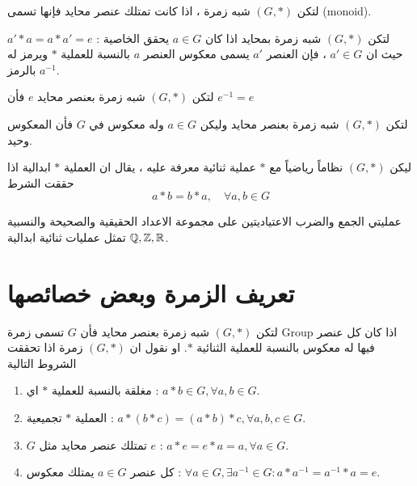 \begin{definition}[(monoid)]
	لتكن $(G, *)$ شبه زمرة ، اذا كانت تمتلك عنصر محايد فإنها تسمى (monoid).
\end{definition}

\begin{definition}[(  المعكوس )]
	لتكن $(G, *)$ شبه زمرة بمحايد اذا كان $a\in G$ يحقق الخاصية : $a'*a=a*a'=e$ حيث ان $a'\in G$ ، فإن العنصر $a'$ يسمى معكوس العنصر $a$ بالنسبة للعملية $*$ ويرمز له بالرمز $a^{-1}$.
\end{definition}

\begin{note}
	لتكن $(G, *)$ شبه زمرة بعنصر محايد $e$ فأن $e^{-1}=e$
\end{note}

\begin{theorem}
	لتكن $(G, *)$ شبه زمرة بعنصر محايد وليكن $a\in G$ وله معكوس في $G$ فأن المعكوس وحيد.
\end{theorem}

\begin{definition}
	ليكن $(G, *)$ نظاماً رياضياً مع $*$ عملية ثنائية معرفة عليه ، يقال ان العملية $*$ ابدالية اذا حققت الشرط
	\[
	a*b = b*a,\quad \forall a,b\in G
	\]
\end{definition}

\begin{example}
	عمليتي الجمع والضرب الاعتياديتين على مجموعة الاعداد الحقيقية والصحيحة والنسبية $\mathbb{Q}, \mathbb{Z}, \mathbb{R}$ تمثل عمليات ثنائية ابدالية. 
\end{example}
\newpage
\section{تعريف الزمرة وبعض خصائصها}
\begin{definition}[( الزمرة )]
	لتكن $(G, *)$ شبه زمرة بعنصر محايد فأن $G$ تسمى زمرة Group اذا كان كل عنصر فيها له معكوس بالنسبة للعملية الثنائية $*$. او نقول ان $(G, *)$ زمرة اذا تحققت الشروط التالية
	\begin{enumerate}[label=$\boxed{\arabic*}$]
		\item مغلقة بالنسبة للعملية $*$ اي : $a*b \in G , \forall a, b\in G$.
		\item العملية $*$ تجميعية : $a*(b*c) = (a*b)*c , \forall a, b,c\in G$.
		\item $G$ تمتلك عنصر محايد مثل $e$ : $a*e =e*a=a, \forall a\in G$.
		\item كل عنصر $a\in G$ يمتلك معكوس : $\forall a\in G, \exists a^{-1}\in G : a*a^{-1}=a^{-1}*a=e$.
	\end{enumerate}    
\end{definition}

